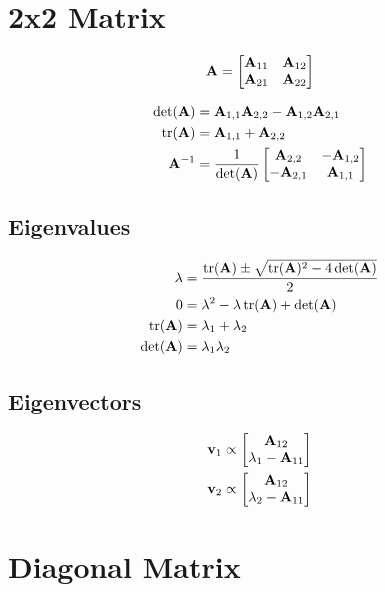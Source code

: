 \section{2x2 Matrix}
\begin{equation}
\mathbf{A}=
\begin{bmatrix}
\mathbf{A}_{11} & \mathbf{A}_{12} \\
\mathbf{A}_{21} & \mathbf{A}_{22}
\end{bmatrix}
\end{equation}

\begin{align}
\det(\mathbf{A})   &= \mathbf{A}_{1,1} \mathbf{A}_{2,2} - \mathbf{A}_{1,2} \mathbf{A}_{2,1} \\
\operatorname{tr}(\mathbf{A}) &= \mathbf{A}_{1,1} + \mathbf{A}_{2,2} \\
\mathbf{A}^{-1}    &= \frac{1}{\det(\mathbf{A})}\begin{bmatrix} \mathbf{A}_{2,2} & -\mathbf{A}_{1,2} \\ -\mathbf{A}_{2,1} & \mathbf{A}_{1,1}\end{bmatrix}
\end{align}
\subsection{Eigenvalues}
\begin{align}
\lambda &= \frac{\operatorname{tr}(\mathbf{A})\pm\sqrt{\operatorname{tr}(\mathbf{A})^2 - 4\det(\mathbf{A})}}{2} \\
0           &= \lambda^2 - \lambda \operatorname{tr}(\mathbf{A}) + \det(\mathbf{A}) \\
\operatorname{tr}(\mathbf{A}) &= \lambda_1 + \lambda_2            \\
\det(\mathbf{A})   &= \lambda_1\lambda_2
\end{align}
\subsection{Eigenvectors}
\begin{align}
\mathbf{v}_1 \propto \begin{bmatrix}\mathbf{A}_{12} \\ \lambda_1 - \mathbf{A}_{11}\end{bmatrix} \\
\mathbf{v}_2 \propto \begin{bmatrix}\mathbf{A}_{12} \\ \lambda_2 - \mathbf{A}_{11}\end{bmatrix} \\
\end{align}



\section{Diagonal Matrix}

